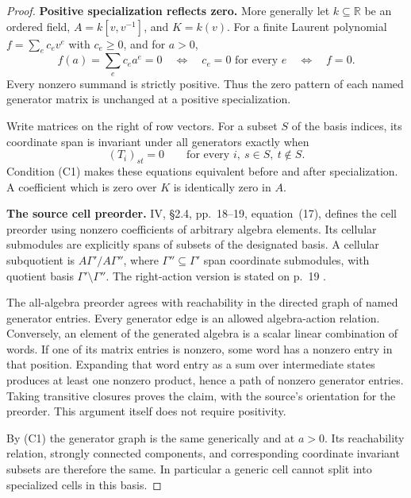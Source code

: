 \begin{proof}
\par\smallskip\noindent\textbf{Positive specialization reflects zero.}\quad
More generally let \(k\subseteq\mathbb R\) be an ordered field,
\(A=k[v,v^{-1}]\), and \(K=k(v)\).
For a finite Laurent polynomial
\(f=\sum_e c_ev^e\) with \(c_e\ge0\), and for \(a>0\),
\[
f(a)=\sum_e c_ea^e=0
\quad\Longleftrightarrow\quad
c_e=0\text{ for every }e
\quad\Longleftrightarrow\quad
f=0.
\tag{C1}
\]
Every nonzero summand is strictly positive.
Thus the zero pattern of each named generator matrix is
unchanged at a positive specialization.

Write matrices on the right of row vectors.
For a subset \(S\) of the basis indices, its coordinate span
is invariant under all generators exactly when
\[
(T_i)_{st}=0
\qquad
\text{for every }i,\ s\in S,\ t\notin S.
\tag{C2}
\]
Condition (C1) makes these equations equivalent before and
after specialization. A coefficient which is zero over \(K\)
is identically zero in \(A\).

\par\smallskip\noindent\textbf{The source cell preorder.}\quad
IV, \S2.4, pp.~18--19, equation~(17), defines the cell preorder
using nonzero coefficients of arbitrary algebra elements.
Its cellular submodules are explicitly spans of subsets
of the designated basis. A cellular subquotient is
\(A\Gamma'/A\Gamma''\), where
\(\Gamma''\subseteq\Gamma'\) span coordinate submodules,
with quotient basis \(\Gamma'\setminus\Gamma''\).
The right-action version is stated on p.~19 \cite{IV}.

The all-algebra preorder agrees with reachability in the
directed graph of named generator entries.
Every generator edge is an allowed algebra-action relation.
Conversely, an element of the generated algebra is a scalar
linear combination of words. If one of its matrix entries is
nonzero, some word has a nonzero entry in that position.
Expanding that word entry as a sum over intermediate states
produces at least one nonzero product, hence a path of nonzero
generator entries. Taking transitive closures proves the
claim, with the source's orientation for the preorder.
This argument itself does not require positivity.

By (C1) the generator graph is the same generically and at
\(a>0\). Its reachability relation, strongly connected
components, and corresponding coordinate invariant subsets
are therefore the same. In particular a generic cell cannot
split into specialized cells in this basis.


\end{proof}
